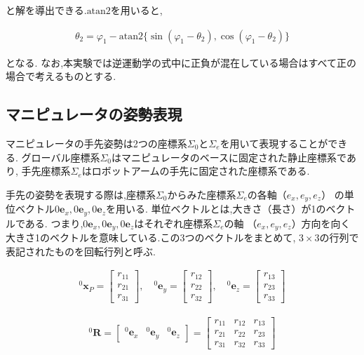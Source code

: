 と解を導出できる.$\text{atan2}$を用いると,

\begin{align}
  \theta_2 = \varphi_1 - \text{atan2} \{ \sin(\varphi_1 - \theta_2), \cos(\varphi_1 - \theta_2) \} \tag{2.14}
\end{align}

となる.
なお,本実験では逆運動学の式中に正負が混在している場合はすべて正の場合で考えるものとする.



\subsection{マニピュレータの姿勢表現}
マニピュレータの手先姿勢は2つの座標系$\Sigma_0$と$\Sigma_e$を用いて表現することができる.
グローバル座標系$\Sigma_0$はマニピュレータのベースに固定された静止座標系であり,
手先座標系$\Sigma_e$はロボットアームの手先に固定された座標系である.

手先の姿勢を表現する際は,座標系$\Sigma_0$からみた座標系$\Sigma_e$の各軸（$e_x, e_y, e_z$）
の単位ベクトル$0\mathbf{e}_x, 0\mathbf{e}_y, 0\mathbf{e}_z$を用いる.
単位ベクトルとは,大きさ（長さ）が1のベクトルである.
つまり,$0\mathbf{e}_x, 0\mathbf{e}_y, 0\mathbf{e}_z$はそれぞれ座標系$\Sigma_e$の軸
（$e_x, e_y, e_z$）方向を向く大きさ1のベクトルを意味している.この3つのベクトルをまとめて,
$3 \times 3$の行列で表記されたものを回転行列と呼ぶ.

\begin{align}
  ^0\mathbf{x}_{P} = \begin{bmatrix} r_{11} \\ r_{21} \\ r_{31} \end{bmatrix}, \quad ^0\mathbf{e}_y = \begin{bmatrix} r_{12} \\ r_{22} \\ r_{32} \end{bmatrix}, \quad ^0\mathbf{e}_z = \begin{bmatrix} r_{13} \\ r_{23} \\ r_{33} \end{bmatrix}
\end{align}

\begin{align}
  ^0\mathbf{R} = \begin{bmatrix} ^0\mathbf{e}_x & ^0\mathbf{e}_y & ^0\mathbf{e}_z \end{bmatrix} = \begin{bmatrix} r_{11} & r_{12} & r_{13} \\ r_{21} & r_{22} & r_{23} \\ r_{31} & r_{32} & r_{33} \end{bmatrix} \tag{2.16}
\end{align}

